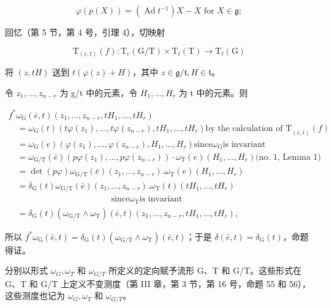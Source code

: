 \[
\varphi (p (X)) = (\operatorname{Ad} t ^ {- 1}) X - X \text { for } X \in \mathfrak {g};
\]

回忆（第 5 节，第 4 号，引理 4），切映射

\[
\mathrm{T} _ {(e, t)} (f): \mathrm{T} _ {e} (\mathrm{G} / \mathrm{T}) \times \mathrm{T} _ {t} (\mathrm{T}) \to \mathrm{T} _ {t} (\mathrm{G})
\]

将 \((z,tH)\) 送到 \(t(\varphi (z) + H)\)，其中 \(z\in \mathfrak{g} / \mathfrak{t},H\in \mathfrak{t}\)。

令 \(z_{1},\ldots,z_{n-r}\) 为 g/t 中的元素，令 \(H_{1},\ldots,H_{r}\) 为 t 中的元素。则

\[
\begin{array}{l} f ^ {*} \omega_ {\mathrm{G}} (\bar {e}, t) (z _ {1}, \ldots , z _ {n - r}, t H _ {1}, \ldots , t H _ {r}) \\ \quad = \omega_ {\mathrm{G}} (t) (t \varphi (z _ {1}), \ldots , t \varphi (z _ {n - r}), t H _ {1}, \ldots , t H _ {r}) \text {by the calculation of T} _ {(\bar {e}, t)} (f) \\ \quad = \omega_ {\mathrm{G}} (e) (\varphi (z _ {1}), \ldots , \varphi (z _ {n - r}), H _ {1}, \ldots , H _ {r}) \text {since} \omega_ {\mathrm{G}} \text {is invariant} \\ \quad = \omega_ {\mathrm{G/T}} (\bar {e}) (p \varphi (z _ {1}), \ldots , p \varphi (z _ {n - r})) \cdot \omega_ {\mathrm{T}} (e) (H _ {1}, \ldots , H _ {r}) \text {(no. 1, Lemma 1)} \\ \quad = \det (p \varphi) \omega_ {\mathrm{G/T}} (\bar {e}) (z _ {1}, \ldots , z _ {n - r}). \omega_ {\mathrm{T}} (e) (H _ {1}, \ldots , H _ {r}) \\ \quad = \delta_ {\mathrm{G}} (t) \omega_ {\mathrm{G/T}} (\bar {e}) (z _ {1}, \ldots , z _ {n - r}). \omega_ {\mathrm{T}} (t) (t H _ {1}, \ldots , t H _ {r}) \\ \qquad \qquad \qquad \qquad \qquad \qquad \text {since} \omega_ {\mathrm{T}} \text {is invariant} \\ \quad = \delta_ {\mathrm{G}} (t) (\omega_ {\mathrm{G/T}} \wedge \omega_ {\mathrm{T}}) (\bar {e}, t) (z _ {1}, \ldots , z _ {n - r}, t H _ {1}, \ldots , t H _ {r}), \end{array}
\]

所以 \(f^{*}\omega_{\mathrm{G}}(\bar{e},t) = \delta_{\mathrm{G}}(t)(\omega_{\mathrm{G / T}}\wedge \omega_{\mathrm{T}})(\bar{e},t)\)；于是 \(\delta (\bar {e},t) = \delta_{\mathrm{G}}(t)\)，命题得证。

分别以形式 \(\omega_{G}, \omega_{T}\) 和 \(\omega_{G/T}\) 所定义的定向赋予流形 G、T 和 G/T。这些形式在 G、T 和 G/T 上定义不变测度（第 III 章，第 3 节，第 16 号，命题 55 和 56），这些测度也记为 \(\omega_{G}, \omega_{T}\) 和 \(\omega_{G/T}\)。


